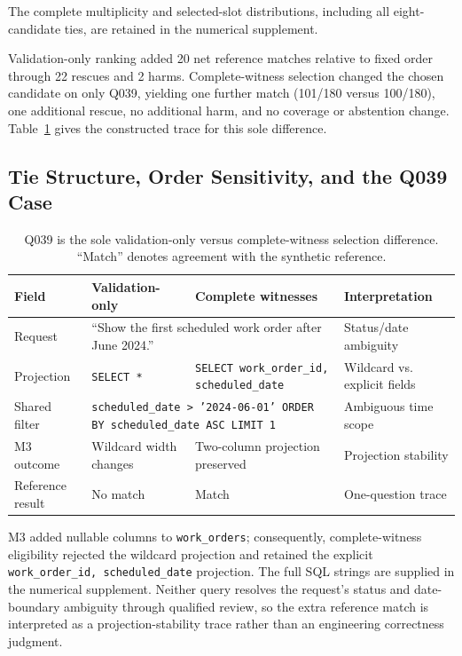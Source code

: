 \documentclass[applsci,article,submit,moreauthors]{Definitions/mdpi}
\begin{document}
The complete multiplicity and selected-slot distributions, including all eight-candidate ties, are retained in the numerical supplement.

Validation-only ranking added 20 net reference matches relative to fixed order through 22 rescues and 2 harms. Complete-witness selection changed the chosen candidate on only Q039, yielding one further match (101/180 versus 100/180), one additional rescue, no additional harm, and no coverage or abstention change. Table~\ref{tab:q039} gives the constructed trace for this sole difference.

\subsection{Tie Structure, Order Sensitivity, and the Q039 Case}

\begin{table}[htbp]
\caption{Q039 is the sole validation-only versus complete-witness selection difference. ``Match'' denotes agreement with the synthetic reference.}
\label{tab:q039}
\centering
\footnotesize
\setlength{\tabcolsep}{3pt}
\begin{tabular}{p{2.2cm}p{4.0cm}p{4.0cm}p{1.8cm}}
\toprule
Field & Validation-only & Complete witnesses & Interpretation\\
\midrule
Request & \multicolumn{2}{p{8.8cm}}{``Show the first scheduled work order after June 2024.''} & Status/date ambiguity\\
Projection & \texttt{SELECT *} & \texttt{SELECT work\_order\_id, scheduled\_date} & Wildcard vs. explicit fields\\
Shared filter & \multicolumn{2}{p{8.8cm}}{\texttt{scheduled\_date > '2024-06-01' ORDER BY scheduled\_date ASC LIMIT 1}} & Ambiguous time scope\\
M3 outcome & Wildcard width changes & Two-column projection preserved & Projection stability\\
Reference result & No match & Match & One-question trace\\
\bottomrule
\end{tabular}
\end{table}

M3 added nullable columns to \texttt{work\_orders}; consequently, complete-witness eligibility rejected the wildcard projection and retained the explicit \texttt{work\_order\_id, scheduled\_date} projection. The full SQL strings are supplied in the numerical supplement. Neither query resolves the request's status and date-boundary ambiguity through qualified review, so the extra reference match is interpreted as a projection-stability trace rather than an engineering correctness judgment.
\end{document}
